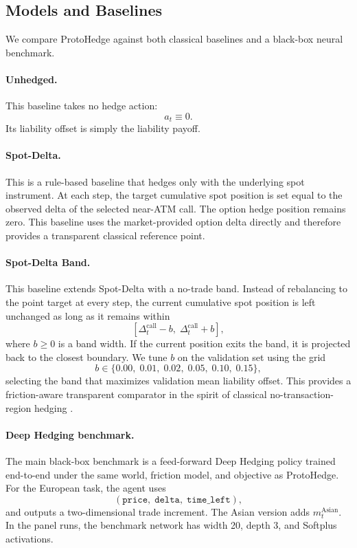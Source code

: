 \documentclass[sigconf]{acmart}
\begin{document}
\subsection{Models and Baselines}
\label{subsec:models_baselines}

We compare ProtoHedge against both classical baselines and a black-box neural benchmark.

\paragraph{Unhedged.}
This baseline takes no hedge action:
\[
a_t \equiv 0.
\]
Its liability offset is simply the liability payoff.

\paragraph{Spot-Delta.}
This is a rule-based baseline that hedges only with the underlying spot instrument. At each step, the target cumulative spot position is set equal to the observed delta of the selected near-ATM call. The option hedge position remains zero. This baseline uses the market-provided option delta directly and therefore provides a transparent classical reference point.

\paragraph{Spot-Delta Band.}
This baseline extends Spot-Delta with a no-trade band. Instead of rebalancing to the point target at every step, the current cumulative spot position is left unchanged as long as it remains within
\[
[\Delta^{\mathrm{call}}_t - b,\; \Delta^{\mathrm{call}}_t + b],
\]
where $b \ge 0$ is a band width. If the current position exits the band, it is projected back to the closest boundary. We tune $b$ on the validation set using the grid
\[
b \in \{0.00,\;0.01,\;0.02,\;0.05,\;0.10,\;0.15\},
\]
selecting the band that maximizes validation mean liability offset.
This provides a friction-aware transparent comparator in the spirit of
classical no-transaction-region hedging \cite{whalley1997}.

\paragraph{Deep Hedging benchmark.}
The main black-box benchmark is a feed-forward Deep Hedging policy trained end-to-end under the same world, friction model, and objective as ProtoHedge. For the European task, the agent uses
\[
(\texttt{price},\; \texttt{delta},\; \texttt{time\_left}),
\]
and outputs a two-dimensional trade increment. The Asian version adds
$m_t^{\mathrm{Asian}}$. In the panel runs, the benchmark network has width 20,
depth 3, and Softplus activations.
\end{document}
